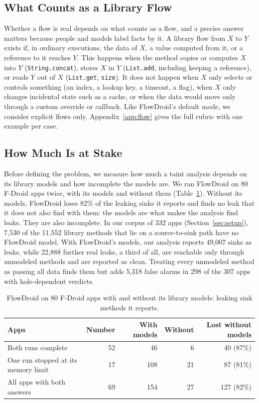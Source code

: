 \subsection{What Counts as a Library Flow}
\label{sec:flow}
Whether a flow is real depends on what counts as a flow, and a precise answer matters because people and models label facts by it.
A library flow from $X$ to $Y$ exists if, in ordinary executions, the data of $X$, a value computed from it, or a reference to it reaches $Y$.
This happens when the method copies or computes $X$ into $Y$ (\texttt{String.concat}), stores $X$ in $Y$ (\texttt{List.add}, including keeping a reference), or reads $Y$ out of $X$ (\texttt{List.get}, \texttt{size}).
It does not happen when $X$ only selects or controls something (an index, a lookup key, a timeout, a flag), when $X$ only changes incidental state such as a cache, or when the data would move only through a custom override or callback.
Like FlowDroid's default mode, we consider explicit flows only.
Appendix~\ref{app:flow} gives the full rubric with one example per case.

\subsection{How Much Is at Stake}
\label{sec:stake}
Before defining the problem, we measure how much a taint analysis depends on its library models and how incomplete the models are.
We ran FlowDroid on 80 F-Droid apps twice, with its models and without them (Table~\ref{tab:fd-none}).
Without its models, FlowDroid loses 82\% of the leaking sinks it reports and finds no leak that it does not also find with them: the models are what makes the analysis find leaks.
They are also incomplete.
In our corpus of 332 apps (Section~\ref{sec:setup}), 7{,}530 of the 11{,}552 library methods that lie on a source-to-sink path have no FlowDroid model.
With FlowDroid's models, our analysis reports 49{,}007 sinks as leaks, while 22{,}888 further real leaks, a third of all, are reachable only through unmodeled methods and are reported as clean.
Treating every unmodeled method as passing all data finds them but adds 5{,}318 false alarms in 298 of the 307 apps with hole-dependent verdicts.

\begin{table}[t]
\caption{FlowDroid on 80 F-Droid apps with and without its library models: leaking sink methods it reports.}
\label{tab:fd-none}
\small
\begin{tabular}{@{}lrrrr@{}}
\toprule
Apps & Number & With models & Without & Lost without models\\
\midrule
Both runs complete & 52 & 46 & 6 & 40 (87\%)\\
One run stopped at its memory limit & 17 & 108 & 21 & 87 (81\%)\\
All apps with both answers & 69 & 154 & 27 & 127 (82\%)\\
\bottomrule
\end{tabular}
\end{table}

